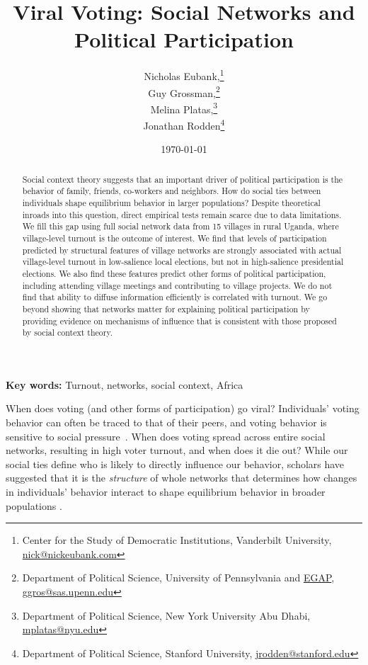 \documentclass[12pt]{article}
\title{Viral Voting: Social Networks and Political Participation}
\date{\today}
\author{Nicholas Eubank,\footnote{Center for the Study of Democratic Institutions, Vanderbilt University, \href{mailto:nick@nickeubank.com}{nick@nickeubank.com}} \\ Guy Grossman,\footnote{Department of Political Science, University of Pennsylvania and \href{http://egap.org/}{EGAP}, \href{mailto:ggros@sas.upenn.edu}{ggros@sas.upenn.edu}} \\ Melina Platas,\footnote{Department of Political Science, New York University Abu Dhabi, \href{mailto:mplatas@nyu.edu}{mplatas@nyu.edu}} \\ Jonathan Rodden\footnote{Department of Political Science, Stanford University, \href{mailto:jrodden@stanford.edu}{jrodden@stanford.edu}}}
\providecommand{\keywords}[1]{\textbf{Key words:} #1}
\begin{document}
\maketitle

\iffalse
\begin{center}
\textbf{Word Count}\\
Abstract: 146\\
Body: 3,564\\
Bibliography: 435\\
Total: 3,999
\end{center}
\fi


\begin{abstract}
    \noindent Social context theory suggests that an important driver of political participation is the behavior of family, friends, co-workers and neighbors. How do social ties between individuals shape equilibrium behavior in larger populations?  Despite theoretical inroads into this question, direct empirical tests remain scarce due to data limitations. We fill this gap using full social network data from 15 villages in rural Uganda, where village-level turnout is the outcome of interest.  We find that levels of participation predicted by structural features of village networks are strongly associated with actual village-level turnout in low-salience local elections, but not in high-salience presidential elections. We also find these features predict other forms of political participation, including  attending village meetings and contributing to village projects. We do not find that ability to diffuse information efficiently is correlated with turnout. We go beyond showing that networks matter for explaining  political participation by providing evidence on mechanisms of influence that is consistent with those proposed by social context theory.
\end{abstract}

\keywords{Turnout, networks, social context, Africa}

\pagebreak
\doublespace

When does voting (and other forms of participation) go viral? Individuals' voting behavior can often be traced to that of their peers, and voting behavior is sensitive to social pressure~\citep{ioannides2013neighborhoods,Gerber:2008fs}. When does voting spread across entire social networks, resulting in high voter turnout, and when does it die out? While our social ties define who is likely to directly influence our behavior, scholars have suggested that it is the \emph{structure} of whole networks that determines how changes in individuals' behavior interact to shape equilibrium behavior in broader populations \citep{Siegel:2009vi,Sinclair:2012tq,Rolfe:2012ka,Fowler:2005ts,Larson:2016vk}.
\end{document}
